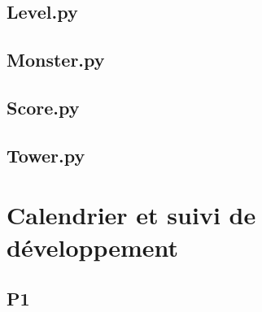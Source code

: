\documentclass[a4paper]{article}
\begin{document}
        \subsection{Level.py}
            \begin{alltt}
                
            \end{alltt}

        \subsection{Monster.py}
            \begin{alltt}
                
            \end{alltt}

        \subsection{Score.py}
            \begin{alltt}
                
            \end{alltt}

        \subsection{Tower.py}
            \begin{alltt}
                
            \end{alltt}

    \section{Calendrier et suivi de développement}
        \subsection{P1}
\end{document}
